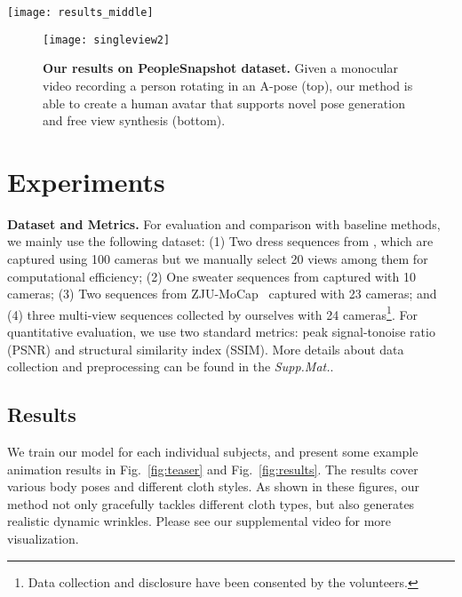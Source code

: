 
\begin{figure*}
    \centering
    \texttt{[image: results\_middle]}
    \caption{\textbf{Example results of our method.} We train our network on various datasets and show the novel pose synthesis results. }
    \label{fig:results}
\end{figure*}





\begin{figure}
    \centering
    \texttt{[image: singleview2]}
    \caption{\textbf{Our results on PeopleSnapshot dataset.} Given a monocular video recording a person rotating in an A-pose (top), our method is able to create a human avatar that supports novel pose generation and free view synthesis (bottom). }
    \label{fig:singleview}
\end{figure}



\section{Experiments}
\label{sec:experiments}
\noindent\textbf{Dataset and Metrics. } 
For evaluation and comparison with baseline methods, we mainly use the following dataset: 
(1) Two dress sequences from \cite{habermann2021realtimeDDC}, which are captured using 100 cameras but we manually select 20 views among them for computational efficiency; (2) One sweater sequences from \cite{habermann2020deepcap} captured with 10 cameras; (3) Two sequences from ZJU-MoCap~\cite{peng2021neuralbody} captured with 23 cameras; and (4) three multi-view sequences collected by ourselves with 24 cameras\footnote{Data collection and disclosure have been consented by the volunteers. }. For quantitative evaluation, we use two standard metrics: peak signal-tonoise ratio (PSNR) and structural similarity index (SSIM).
More details about data collection and preprocessing can be found in the \textit{Supp.Mat.}.


\subsection{Results}
We train our model for each individual subjects, and present some example animation results in Fig.~\ref{fig:teaser} and Fig.~\ref{fig:results}. 
The results cover various body poses and different cloth styles. 
As shown in these figures, our method not only gracefully tackles different cloth types, but also generates realistic dynamic wrinkles. 
Please see our supplemental video for more visualization. 

